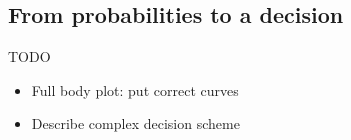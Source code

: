 



\subsection{From probabilities to a decision}

TODO
\begin{itemize}
    \item Full body plot: put correct curves
    \item Describe complex decision scheme
\end{itemize}

